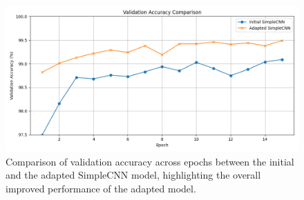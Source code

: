 
  \begin{figure} [ht]
    \centering
    \includegraphics[width=.9\textwidth]{figures/simpleCNN_old_vs_new.png}
    \caption{Comparison of validation accuracy across epochs between the initial and the adapted SimpleCNN model, highlighting the overall improved performance of the adapted model.}\label{fig:SimpleCNN_old_new}
\end{figure}

